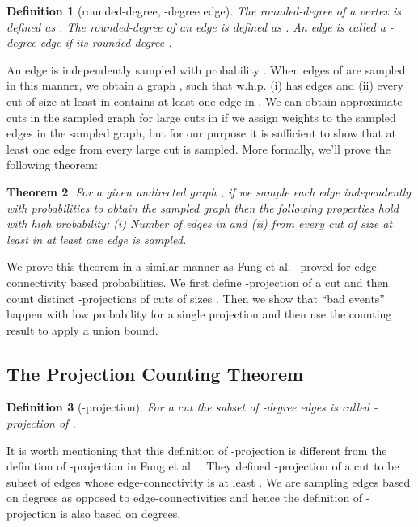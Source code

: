\documentclass[11pt]{article}
\newtheorem{theorem}{Theorem}
\newtheorem{definition}[theorem]{Definition}
\begin{document}
\begin{definition}[rounded-degree, -degree edge]
  The rounded-degree of a vertex  is defined as . 
  The rounded-degree of an edge  is defined as . 
  An edge  is called a -degree edge if its rounded-degree . 
\end{definition}

An edge  is independently sampled with probability . 
When edges of  are sampled in this manner, we obtain a graph , such that w.h.p. (i)  has  edges and (ii) every cut of size at least  in  contains at least one edge in .
We can obtain approximate cuts in the sampled graph for large cuts in  if we assign weights  to the sampled edges in the sampled graph, but for our purpose it is sufficient to show that at least one edge from every large cut is sampled. 
More formally, we'll prove the following theorem:
\begin{theorem}
  For a given undirected graph , if we sample each edge  independently with probabilities  to obtain the sampled graph  then the following properties hold with high probability: 
  (i) Number of edges in  and (ii) from every cut of size at least  in  at least one edge is sampled. 
\end{theorem}
\noindent We prove this theorem in a similar manner as Fung et al.~\cite{fung2011stoc} proved for edge-connectivity based probabilities. 
We first define -projection of a cut and then count distinct -projections of cuts of sizes . 
Then we show that ``bad events'' happen with low probability for a single projection and then use the counting result to apply a union bound. 
\subsection{The Projection Counting Theorem}
\begin{definition}[-projection]
  For a cut  the subset  of -degree edges is called -projection of . 
\end{definition}
It is worth mentioning that this definition of -projection is different from the definition of -projection in Fung et al.~\cite{fung2011stoc}. 
They defined -projection of a cut  to be subset  of edges whose edge-connectivity is at least . 
We are sampling edges based on degrees as opposed to edge-connectivities and hence the definition of -projection is also based on degrees. 
\end{document}
